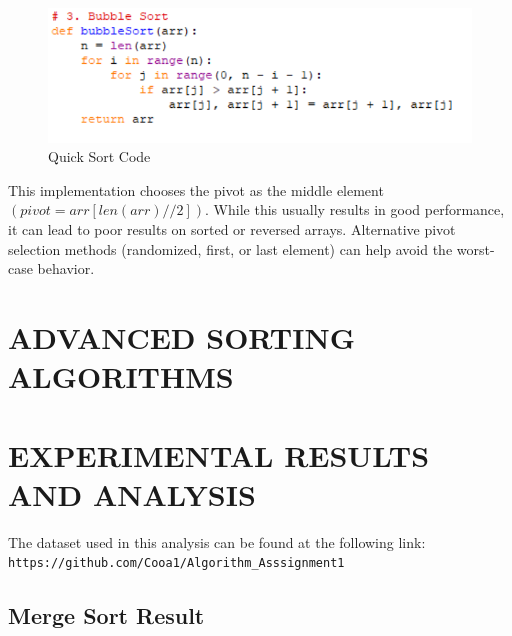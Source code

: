 \documentclass[sigconf]{acmart}
\begin{document}
\begin{figure}[H]
\centering
\includegraphics[width=0.85\linewidth]{figures/006.pdf}
\vspace{-0.3cm}
\caption{Quick Sort Code}  
\vspace{-0.35cm}
\label{fig:proportion}
\end{figure}

This implementation chooses the pivot as the middle element $(pivot = arr[len(arr) // 2])$. While this usually results in good performance, it can lead to poor results on sorted or reversed arrays. Alternative pivot selection methods (randomized, first, or last element) can help avoid the worst-case behavior.

\section{ADVANCED SORTING ALGORITHMS}

\section{EXPERIMENTAL RESULTS AND ANALYSIS}

The dataset used in this analysis can be found at the following link: 
\texttt{https://github.com/Cooa1/Algorithm\_Asssignment1}

\subsection{Merge Sort Result}
\end{document}
